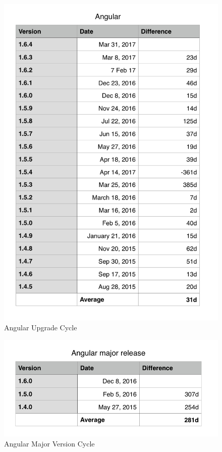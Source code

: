 \begin{figure}
\includegraphics[width=15cm]{images/angularUpgradeCycle}
\caption{Angular Upgrade Cycle}
\label{attachment:angularUpgradeCycle}
\end{figure}

\begin{figure}
\includegraphics[width=15cm]{images/angularMajor}
\caption{Angular Major Version Cycle}
\label{attachment:angularMajor}
\end{figure}

